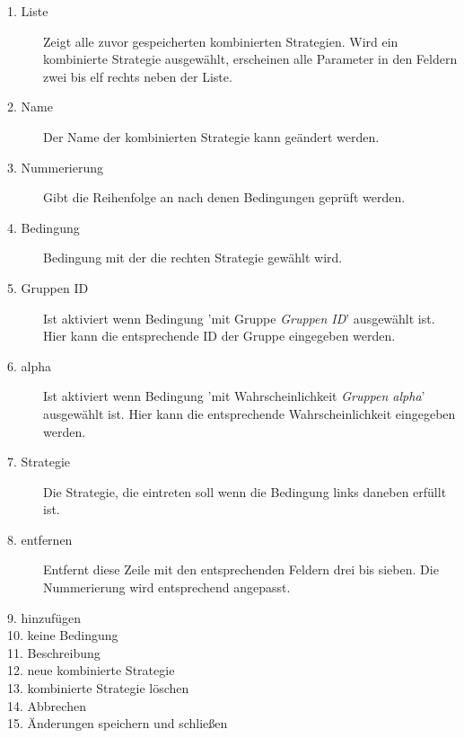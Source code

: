 \begin{description}

\item[1. Liste] Zeigt alle zuvor gespeicherten  kombinierten Strategien. Wird ein kombinierte Strategie ausgewählt, erscheinen alle Parameter in den Feldern zwei bis elf rechts neben der Liste.

\item[2. Name] Der Name der kombinierten Strategie kann geändert werden.

\item[3. Nummerierung] Gibt die Reihenfolge an nach denen Bedingungen geprüft werden.

\item[4. Bedingung] Bedingung mit der die rechten Strategie gewählt wird.

\item[5. Gruppen ID] Ist aktiviert wenn Bedingung 'mit Gruppe \textit{Gruppen ID}' ausgewählt ist. Hier kann die entsprechende ID der Gruppe eingegeben werden.

\item[6. alpha] Ist aktiviert wenn Bedingung 'mit Wahrscheinlichkeit \textit{Gruppen alpha}' ausgewählt ist. Hier kann die entsprechende Wahrscheinlichkeit eingegeben werden.

\item[7. Strategie] Die Strategie, die eintreten soll wenn die Bedingung links daneben erfüllt ist.

\item[8. entfernen] Entfernt diese Zeile mit den entsprechenden Feldern drei bis sieben. Die Nummerierung wird entsprechend angepasst.

\item[9. hinzufügen] 

\item[10. keine Bedingung] 

\item[11. Beschreibung] 

\item[12. neue kombinierte Strategie] 

\item[13. kombinierte Strategie löschen] 

\item[14. Abbrechen] 

\item[15. Änderungen speichern und schließen] 

\end{description}

